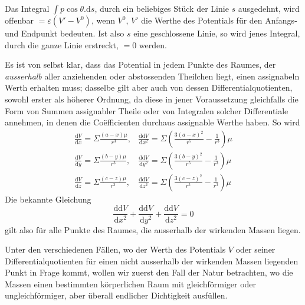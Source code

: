 Das Integral $\int p\cos\theta.\mathrm{d}s$, durch ein beliebiges Stück der Linie $s$ ausgedehnt, wird offenbar $=\varepsilon(V'-V^0)$, wenn $V^0$, $V'$ die Werthe des Potentials für den Anfangs- und Endpunkt bedeuten. Ist also $s$ eine geschlossene Linie, so wird jenes Integral, durch die ganze Linie erstreckt, $=0$ werden.

Es ist von selbst klar, dass das Potential in jedem Punkte des Raumes, der \textit{ausserhalb} aller anziehenden oder abstossenden Theilchen liegt, einen assignabeln Werth erhalten muss; dasselbe gilt aber auch von dessen Differentialquotienten, sowohl erster als höherer Ordnung, da diese in jener Voraussetzung gleichfalls die Form von Summen assignabler Theile oder von Integralen solcher Differentiale annehmen, in denen die Coëfficienten durchaus assignable Werthe haben. So wird
\[
\begin{array}{ll}
\displaystyle\frac{\mathrm{d}V}{\mathrm{d}x}=\Sigma\frac{(a-x)\mu}{r^3},&\displaystyle\frac{\mathrm{d}\mathrm{d}V}{\mathrm{d}x^2}=\Sigma(\frac{3(a-x)^2}{r^5}-\frac{1}{r^3})\mu\\[6pt]
\displaystyle\frac{\mathrm{d}V}{\mathrm{d}y}=\Sigma\frac{(b-y)\mu}{r^3},&\displaystyle\frac{\mathrm{d}\mathrm{d}V}{\mathrm{d}y^2}=\Sigma(\frac{3(b-y)^2}{r^5}-\frac{1}{r^3})\mu\\[6pt]
\displaystyle\frac{\mathrm{d}V}{\mathrm{d}z}=\Sigma\frac{(c-z)\mu}{r^3},&\displaystyle\frac{\mathrm{d}\mathrm{d}V}{\mathrm{d}z^2}=\Sigma(\frac{3(c-z)^2}{r^5}-\frac{1}{r^3})\mu
\end{array}
\]
Die bekannte Gleichung
\[
\frac{\mathrm{d}\mathrm{d}V}{\mathrm{d}x^2}+\frac{\mathrm{d}\mathrm{d}V}{\mathrm{d}y^2}+\frac{\mathrm{d}\mathrm{d}V}{\mathrm{d}z^2}=0
\]
gilt also für alle Punkte des Raumes, die ausserhalb der wirkenden Massen liegen.

Unter den verschiedenen Fällen, wo der Werth des Potentials $V$ oder seiner Differentialquotienten für einen nicht ausserhalb der wirkenden Massen liegenden Punkt in Frage kommt, wollen wir zuerst den Fall der Natur betrachten, wo die Massen einen bestimmten körperlichen Raum mit gleichförmiger oder ungleichförmiger, aber überall endlicher Dichtigkeit ausfüllen.

